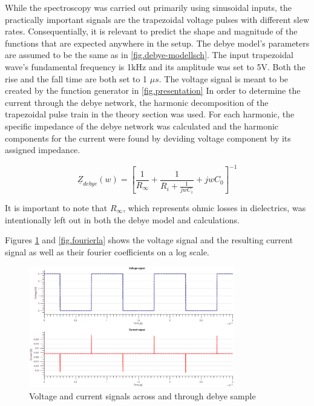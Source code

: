 While the spectroscopy was carried out primarily using sinusoidal inputs,
the practically important signals are the trapezoidal voltage pulses with different
slew rates. Consequentially, it is relevant to predict the shape and magnitude
of the functions that are expected anywhere in the setup. 
The debye model's parameters are assumed to be the same as in \ref{fig.debye-modellsch}.
The input trapezoidal wave's fundamental frequency is 1kHz and its amplitude was
set to 5V. Both the rise and 
the fall time are both set to 1 $\mu s$. The voltage signal is meant to be created
by the function generator in \ref{fig.presentation}
\newline
In order to determine the current through the debye network, the harmonic decomposition of
the trapezoidal pulse train in the theory section was used. For each harmonic, the specific
impedance of the debye network was calculated and the harmonic components for the current were found by deviding voltage component by its assigned impedance.

\begin{equation}
 \underline{Z}_{debye}(w)=\left[\frac{1}{R_{\infty}}+\frac{1}{R_{i}+\frac{1}{jwC_{i}}}+jwC_{0}\right]^{-1}
 \label{debyeimpedance}
\end{equation}

It is important to note that $R_{\infty}$, which represents
ohmic losses in dielectrics, was intentionally left out in both the debye model and calculations.

Figures \ref{fig.beforeandafter} and \ref{fig.fourierla} shows the voltage signal and the resulting current signal as well as their fourier coefficients on a log scale.

\begin{figure}[h!tb]
\centerline{\includegraphics[width=0.8\textwidth]{figures/Method/signal_simulation/beforeandafter.eps}}
\caption{Voltage and current signals across and through debye sample}
\label{fig.beforeandafter}
\end{figure}

